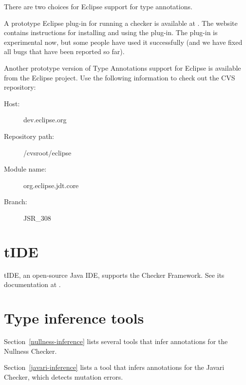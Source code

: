 There are two choices for Eclipse support for type annotations.

A prototype Eclipse plug-in for running a checker is available at
.  
The website contains instructions for installing and using the plug-in.
The plug-in is
experimental now, but some people have used it successfully (and we have fixed
all bugs that have been reported so far).

Another prototype version of Type Annotations support for Eclipse is
available from the Eclipse project.  Use the following information to check
out the CVS repository:
\begin{description}
\item[Host:]                 dev.eclipse.org
\item[Repository path:] /cvsroot/eclipse
\item[Module name:]    org.eclipse.jdt.core
\item[Branch:]             JSR\_308
\end{description}


\section{tIDE\label{tide}}

tIDE, an open-source Java IDE, supports the Checker Framework.  See its
documentation at .


\section{Type inference tools\label{type-inference-tools}}

Section~\ref{nullness-inference} lists several tools that infer
annotations for the Nullness Checker.

Section~\ref{javari-inference} lists a tool that infers
annotations for the Javari Checker, which detects mutation errors.


